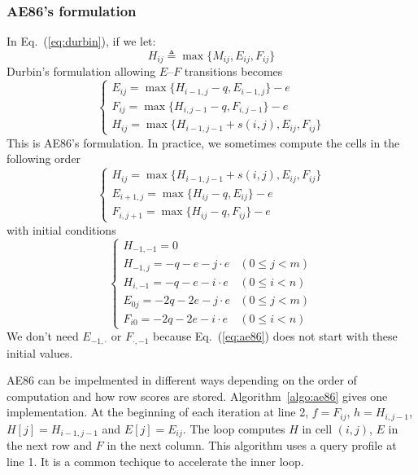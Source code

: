 \documentclass{bioinfo}
\begin{document}
\begin{methods}
\subsubsection{AE86's formulation}

In Eq.~(\ref{eq:durbin}), if we let:
\[H_{ij}\triangleq\max\{M_{ij},E_{ij},F_{ij}\}\]
Durbin's formulation allowing $E$--$F$ transitions becomes
\begin{equation}\label{eq:ae86-ori}
\left\{\begin{array}{l}
E_{ij}=\max\{H_{i-1,j}-q, E_{i-1,j}\} - e \\
F_{ij}=\max\{H_{i,j-1}-q, F_{i,j-1}\} - e \\
H_{ij}=\max\{H_{i-1,j-1}+s(i,j), E_{ij}, F_{ij}\}
\end{array}\right.
\end{equation}
This is AE86's formulation. In practice, we sometimes compute the cells in the
following order
\begin{equation}\label{eq:ae86}
\left\{\begin{array}{l}
H_{ij}=\max\{H_{i-1,j-1}+s(i,j), E_{ij}, F_{ij}\}\\
E_{i+1,j}=\max\{H_{ij}-q, E_{ij}\} - e \\
F_{i,j+1}=\max\{H_{ij}-q, F_{ij}\} - e
\end{array}\right.
\end{equation}
with initial conditions
\begin{equation}
\left\{\begin{array}{ll}
H_{-1,-1}=0\\
H_{-1,j}=-q-e-j\cdot e & (0\le j<m)\\
H_{i,-1}=-q-e-i\cdot e & (0\le i<n)\\
E_{0j}=-2q-2e-j\cdot e & (0\le j<m)\\
F_{i0}=-2q-2e-i\cdot e & (0\le i<n)
\end{array}\right.
\end{equation}
We don't need $E_{-1,\cdot}$ or $F_{\cdot,-1}$ because Eq.~(\ref{eq:ae86})
does not start with these initial values.

AE86 can be impelmented in different ways depending on the order of computation
and how row scores are stored. Algorithm~\ref{algo:ae86} gives one
implementation. At the beginning of each iteration at line 2, $f=F_{ij}$,
$h=H_{i,j-1}$, $H[j]=H_{i-1,j-1}$ and $E[j]=E_{ij}$. The loop computes
$H$ in cell $(i,j)$, $E$ in the next row and $F$ in the next column.
This algorithm uses a query profile at line 1. It is a common techique
to accelerate the inner loop.


\end{methods}
\end{document}
